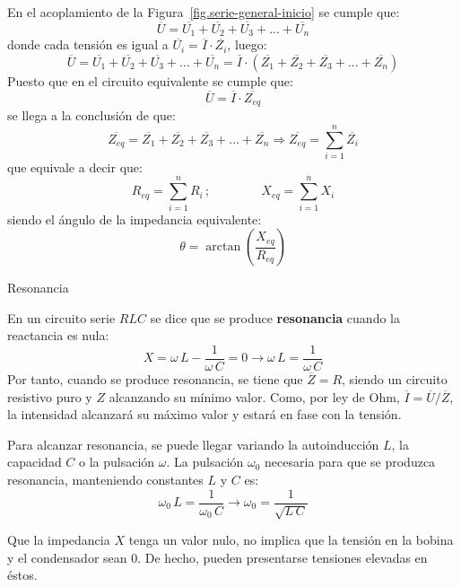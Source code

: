 \documentclass[11pt]{book} %
\makeatletter
\numberwithin{dummy}{section}
\theoremstyle{ocrenumbox}
\theoremstyle{blacknumex}
\theoremstyle{blacknumbox}
\theoremstyle{ocrenum}
\newenvironment{remark}{\par\vspace{10pt}\small %
\begin{list}{}{
\leftmargin=35pt %
\rightmargin=25pt}\item\ignorespaces %
\makebox[-2.5pt]{\begin{tikzpicture}[overlay]
\node[draw=ocre!60,line width=1pt,circle,fill=ocre!25,font=\sffamily\bfseries,inner sep=2pt,outer sep=0pt] at (-15pt,0pt){\textcolor{ocre}{N}};\end{tikzpicture}} %
\advance\baselineskip -1pt}{\end{list}\vskip5pt} %
\renewcommand{\subsection}{\@startsection {subsection}{2}{\z@}
{-3ex \@plus -0.1ex \@minus -.4ex}
{0.5ex \@plus.2ex }
{\normalfont\sffamily\bfseries}}
\newlength\esp
\makeatother
\begin{document}
	En el acoplamiento de la Figura~\ref{fig.serie-general-inicio} se cumple que:
	\begin{equation*}
		\overline{U}=\overline{U_1}+\overline{U_2}+\overline{U_3}+...+\overline{U_n}
	\end{equation*}
	donde cada tensión es igual a $\overline{U_i}=\overline{I}\cdot\overline{Z_i}$, luego: 
	\begin{equation*}
		\overline{U}=\overline{U_1}+\overline{U_2}+\overline{U_3}+...+\overline{U_n}=\overline{I} \cdot(\overline{Z_1}+\overline{Z_2}+\overline{Z_3}+...+\overline{Z_n})
	\end{equation*}
	Puesto que en el circuito equivalente se cumple que: 
	\begin{equation*}
		\overline{U}=\overline{I}\cdot\overline{Z_{eq}}
	\end{equation*}
	se llega a la conclusión de que:
	\begin{equation}
		\overline{Z_{eq}}=\overline{Z_1}+\overline{Z_2}+\overline{Z_3}+...+\overline{Z_n}\Rightarrow \boxed{\overline{Z_{eq}}=\sum_{i=1}^n \overline{Z_i}}
	\end{equation}
	que equivale a decir que: 
	\begin{equation*}
		R_{eq}=\sum_{i=1}^n R_i\,;\qquad \qquad X_{eq}=\sum_{i=1}^n X_i
	\end{equation*}
	siendo el ángulo de la impedancia equivalente:
	\begin{equation*}
		\theta=\arctan\left(\dfrac{X_{eq}}{R_{eq}}\right)
	\end{equation*}
	
	\subsection{Resonancia}\label{sec.resonancia_serie}
	
	En un circuito serie $RLC$ se dice que se produce \textbf{resonancia} cuando la reactancia es nula:
	\begin{equation*}
		X=\omega\,L-\dfrac{1}{\omega\,C}=0\rightarrow \omega\,L=\dfrac{1}{\omega\,C}
	\end{equation*}
	Por tanto, cuando se produce resonancia, se tiene que $\overline{Z}=R$, siendo un circuito resistivo puro y $Z$ alcanzando su mínimo valor. Como, por ley de Ohm, $\overline{I}=\overline{U}/\overline{Z}$, la intensidad alcanzará su máximo valor y estará en fase con la tensión. 
	
	Para alcanzar resonancia, se puede llegar variando la autoinducción $L$, la capacidad $C$ o la pulsación $\omega$. La pulsación $\omega_0$ necesaria para que se produzca resonancia, manteniendo constantes $L$ y $C$ es:
	\begin{equation}
		\omega_0\,L=\dfrac{1}{\omega_0\,C}\rightarrow \boxed{\omega_0=\dfrac{1}{\sqrt{L\,C}}}
	\end{equation}
	\begin{remark}
		Que la impedancia $X$ tenga un valor nulo, no implica que la tensión en la bobina y el condensador sean 0. De hecho, pueden presentarse tensiones elevadas en éstos.
	\end{remark}
	
\end{document}
